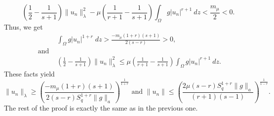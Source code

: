 \documentclass[12pt, notitlepage]{article}
\begin{document}
{$$\left (\frac{1}{2}-\frac{1}{s+1}\right )\|u_n\|^2_\lambda-\mu\left (\frac{1}{r+1}-\frac{1}{s+1}\right )\int_\Omega g|u_n|^{r+1}\ dz<\frac{m_\mu}{2}<0.$$
Thus, we get 
\begin{align}
    &\int_\Omega g|u_n|^{1+r}\;dz>\frac{-m_\mu(1+r)(s+1)}{2(s-r)}>0,\label{RT1}\\
    \text{ and }&\nonumber\\
    &\left (\frac{1}{2}-\frac{1}{s+1}\right )\|u_n\|^2_\lambda\leq \mu\left (\frac{1}{r+1}-\frac{1}{s+1}\right )\int_\Omega g|u_n|^{r+1}\ dz.\label{RT2}
\end{align}
These facts yield 
$$\|u_n\|_\lambda\geq \left(\frac{-m_\mu(1+r)(s+1)}{2(s-r)S_q^{1+r}\|g\|_a}\right )^\frac{1}{1+r} \text{ and }\|u_n\|\leq \left (\frac{2\mu(s-r)S_q^{1+r}\|g\|_a}{(r+1)(s-1)}\right )^\frac{1}{1-r}.$$
The rest of the proof is exactly the same as in the previous one.


}
\end{document}
